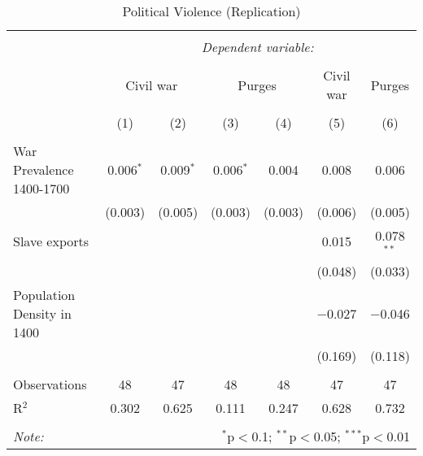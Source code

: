 
\begin{table}[!htbp] \centering 
  \caption{Political Violence (Replication)} 
  \label{} 
\footnotesize 
\begin{tabular}{@{\extracolsep{2pt}}lcccccc} 
\\[-1.8ex]\hline 
\hline \\[-1.8ex] 
 & \multicolumn{6}{c}{\textit{Dependent variable:}} \\ 
\cline{2-7} 
\\[-1.8ex] & \multicolumn{2}{c}{Civil war} & \multicolumn{2}{c}{Purges} & Civil war & Purges \\ 
\\[-1.8ex] & (1) & (2) & (3) & (4) & (5) & (6)\\ 
\hline \\[-1.8ex] 
 War Prevalence 1400-1700 & 0.006$^{*}$ & 0.009$^{*}$ & 0.006$^{*}$ & 0.004 & 0.008 & 0.006 \\ 
  & (0.003) & (0.005) & (0.003) & (0.003) & (0.006) & (0.005) \\ 
  Slave exports &  &  &  &  & 0.015 & 0.078$^{**}$ \\ 
  &  &  &  &  & (0.048) & (0.033) \\ 
  Population Density in 1400 &  &  &  &  & $-$0.027 & $-$0.046 \\ 
  &  &  &  &  & (0.169) & (0.118) \\ 
 \hline \\[-1.8ex] 
Observations & 48 & 47 & 48 & 48 & 47 & 47 \\ 
R$^{2}$ & 0.302 & 0.625 & 0.111 & 0.247 & 0.628 & 0.732 \\ 
\hline 
\hline \\[-1.8ex] 
\textit{Note:}  & \multicolumn{6}{r}{$^{*}$p$<$0.1; $^{**}$p$<$0.05; $^{***}$p$<$0.01} \\ 
\end{tabular} 
\end{table} 
